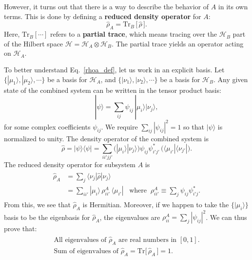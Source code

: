\documentclass[pra,12pt]{revtex4}
\begin{document}
However, it turns out that there is a way to describe the behavior of
$A$ in its own terms.  This is done by defining a \textbf{reduced
  density operator} for $A$:
\begin{equation}
  \hat{\rho}_A = \mathrm{Tr}_B \,\big[\,\hat{\rho}\,\big].
  \label{rhoa_def}
\end{equation}
Here, $\mathrm{Tr}_B[\cdots]$ refers to a \textbf{partial trace},
which means tracing over the $\mathscr{H}_B$ part of the Hilbert space
$\mathscr{H} = \mathscr{H}_A \otimes \mathscr{H}_B$.  The partial
trace yields an operator acting on $\mathscr{H}_A$.

To better understand Eq.~\eqref{rhoa_def}, let us work in an explicit
basis.  Let $\{|\mu_1\rangle, |\mu_2\rangle,\cdots\}$ be a basis for
$\mathscr{H}_A$, and $\{|\nu_1\rangle, |\nu_2\rangle,\cdots\}$ be a
basis for $\mathscr{H}_B$.  Any given state of the combined system can
be written in the tensor product basis:
\begin{equation}
  |\psi\rangle = \sum_{ij} \psi_{ij} \, |\mu_i\rangle  |\nu_j\rangle,
\end{equation}
for some complex coefficients $\psi_{ij}$.  We require $\sum_{ij}
|\psi_{ij}|^2 = 1$ so that $|\psi\rangle$ is normalized to unity.  The
density operator of the combined system is
\begin{equation}
  \hat{\rho} = |\psi\rangle \langle\psi| = \sum_{ii'jj'} \Big( |\mu_i\rangle  |\nu_j\rangle\Big) \psi_{ij} \psi_{i'j'}^* \, \Big(\langle \mu_{i'}|  \langle \nu_{j'}|\Big).
\end{equation}
The reduced density operator for subsystem $A$ is
\begin{align}
  \begin{aligned}\hat{\rho}_A &= \sum_j \langle \nu_j | \hat{\rho} | \nu_j \rangle \\ &= \sum_{ii'} |\mu_i\rangle \,\rho_{ii'}^A \, \langle \mu_{i'}| \;\;\;\mathrm{where} \;\; \rho_{ii'}^A \equiv \sum_j \psi_{ij} \psi_{i'j}^*.\end{aligned}
  \label{rhoa_explicit}
\end{align}
From this, we see that $\hat{\rho}_A$ is Hermitian.  Moreover, if we
happen to take the $\{|\mu_i\rangle\}$ basis to be the eigenbasis for
$\hat{\rho}_A$, the eigenvalues are $\rho_{ii}^A = \sum_j
|\psi_{ij}|^2$.  We can thus prove that:
\begin{align}
  \begin{aligned}
    \textrm{All eigenvalues of $\hat{\rho}_A$ are real numbers in $[0,1]$.} \\
    \textrm{Sum of eigenvalues of $\hat{\rho}_A$} = \mathrm{Tr}\big[\,\hat{\rho}_A \,\big] = 1.
  \end{aligned}
  \label{trrho_reduced}
\end{align}
\end{document}
